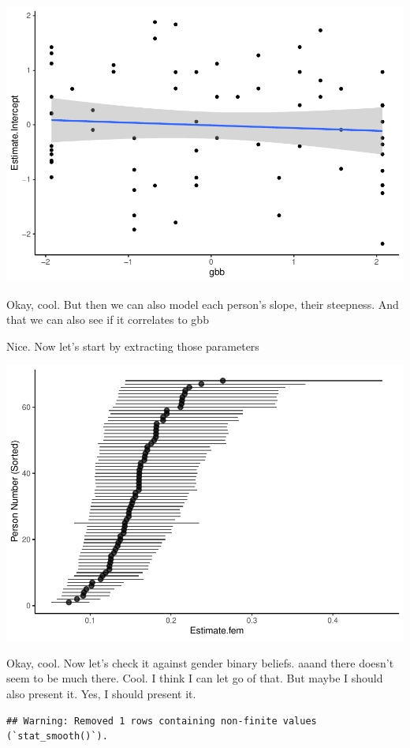 \documentclass[
  man]{apa7}
\begin{document}
\includegraphics{resp_opts_manus23022_files/figure-latex/rq2-modelling 2-1.pdf}

Okay, cool. But then we can also model each person's slope, their steepness. And that we can also see if it correlates to gbb

Nice. Now let's start by extracting those parameters

\includegraphics{resp_opts_manus23022_files/figure-latex/unnamed-chunk-12-1.pdf}

Okay, cool. Now let's check it against gender binary beliefs. aaand there doesn't seem to be much there. Cool. I think I can let go of that. But maybe I should also present it. Yes, I should present it.

\begin{verbatim}
## Warning: Removed 1 rows containing non-finite values (`stat_smooth()`).
\end{verbatim}
\end{document}
